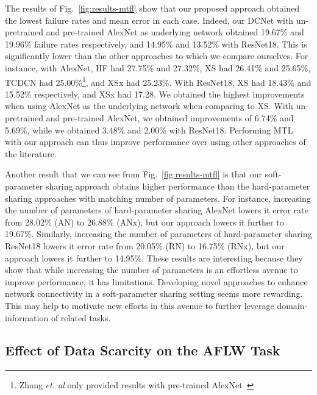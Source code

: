\documentclass[runningheads]{llncs}
\newcommand{\citep}{\cite}
\begin{document}
The results of Fig.~\ref{fig:results-mtfl} show that our proposed approach obtained the lowest failure rates and mean error in each case. Indeed, our DCNet with un-pretrained and pre-trained AlexNet as underlying network obtained 19.67\% and 19.96\% failure rates respectively, and 14.95\% and 13.52\% with  ResNet18. This is significantly lower than the other approaches to which we compare ourselves. For instance, with AlexNet, HF had 27.75\% and 27.32\%, XS had 26.41\% and 25.65\%, TCDCN had 25.00\%\footnote{Zhang \textit{et. al} only provided results with pre-trained AlexNet~\citep{zhang2014facial}}, and XSx had 25.23\%. With ResNet18, XS had 18.43\% and 15.52\% respectively, and XSx had 17.28. We obtained the highest improvements when using AlexNet as the underlying network when comparing to XS. With un-pretrained and pre-trained AlexNet, we obtained improvements of 6.74\% and 5.69\%, while we obtained 3.48\% and 2.00\% with ResNet18. Performing MTL with our approach can thus improve performance over using other approaches of the literature.


Another result that we can see from Fig.~\ref{fig:results-mtfl} is that our soft-parameter sharing approach obtains higher performance than the hard-parameter sharing approaches with matching number of parameters. For instance, increasing the number of parameters of hard-parameter sharing AlexNet lowers it error rate from 28.02\% (AN) to 26.88\% (ANx), but our approach lowers it further to 19.67\%. Similarly, increasing the number of parameters of hard-parameter sharing ResNet18 lowers it error rate from 20.05\% (RN) to 16.75\% (RNx), but our approach lowers it further to 14.95\%. These results are interesting because they show that while increasing the number of parameters is an effortless avenue to improve performance, it has limitations. Developing novel approaches to enhance network connectivity in a soft-parameter sharing setting seems more rewarding. This may help to motivate new efforts in this avenue to further leverage domain-information of related tasks.

\subsection{Effect of Data Scarcity on the AFLW Task}
\end{document}
